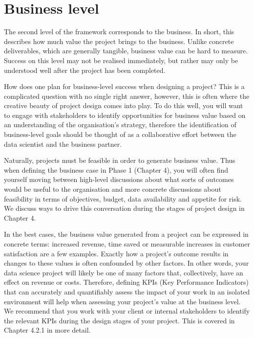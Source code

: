 \documentclass[
]{book}
\begin{document}
\hypertarget{business-level}{%
\section{Business level}\label{business-level}}

The second level of the framework corresponds to the business. In short, this describes how much value the project brings to the business. Unlike concrete deliverables, which are generally tangible, business value can be hard to measure. Success on this level may not be realised immediately, but rather may only be understood well after the project has been completed.

How does one plan for business-level success when designing a project? This is a complicated question with no single right answer, however, this is often where the creative beauty of project design comes into play. To do this well, you will want to engage with stakeholders to identify opportunities for business value based on an understanding of the organisation's strategy, therefore the identification of business-level goals should be thought of as a collaborative effort between the data scientist and the business partner.

Naturally, projects must be feasible in order to generate business value. Thus when defining the business case in Phase 1 (Chapter 4), you will often find yourself moving between high-level discussions about what sorts of outcomes would be useful to the organisation and more concrete discussions about feasibility in terms of objectives, budget, data availability and appetite for risk. We discuss ways to drive this conversation during the stages of project design in Chapter 4.

In the best cases, the business value generated from a project can be expressed in concrete terms: increased revenue, time saved or measurable increases in customer satisfaction are a few examples. Exactly how a project's outcome results in changes to these values is often confounded by other factors. In other words, your data science project will likely be one of many factors that, collectively, have an effect on revenue or costs. Therefore, defining KPIs (Key Performance Indicators) that can accurately and quantifiably assess the impact of your work in an isolated environment will help when assessing your project's value at the business level. We recommend that you work with your client or internal stakeholders to identify the relevant KPIs during the design stages of your project. This is covered in Chapter 4.2.1 in more detail.
\end{document}
